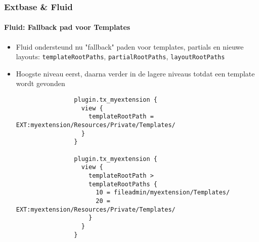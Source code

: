 \begin{frame}[fragile]
	\frametitle{Extbase \& Fluid}
	\framesubtitle{Fluid: Fallback pad voor Templates}

	\lstset{
		basicstyle=\tiny\ttfamily
	}

	\begin{itemize}
		\item Fluid ondersteund nu "fallback" paden voor templates, partials en nieuwe layouts:\newline
			\smaller\texttt{templateRootPaths}, \texttt{partialRootPaths}, \texttt{layoutRootPaths}\normalsize
		\item Hoogste niveau eerst, daarna verder in de lagere niveaus totdat een template wordt gevonden

			\begin{lstlisting}
				plugin.tx_myextension {
				  view {
				    templateRootPath = EXT:myextension/Resources/Private/Templates/
				  }
				}

				plugin.tx_myextension {
				  view {
				    templateRootPath >
				    templateRootPaths {
				      10 = fileadmin/myextension/Templates/
				      20 = EXT:myextension/Resources/Private/Templates/
				    }
				  }
				}
			\end{lstlisting}

	\end{itemize}

\end{frame}


